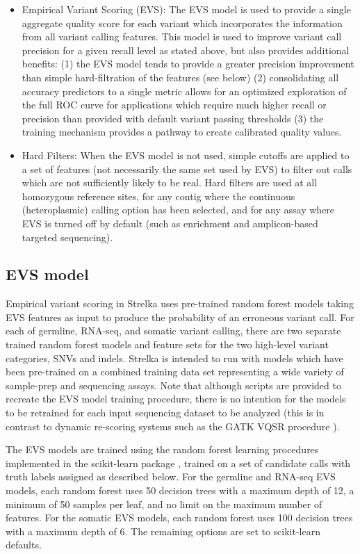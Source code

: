 \documentclass{article}
\begin{document}
\begin{itemize}
    \item Empirical Variant Scoring (EVS):
    The EVS model is used to provide a single aggregate quality score for each variant which incorporates the information from all variant calling features. This model is used to improve variant call precision for a given recall level as stated above, but also provides additional benefits: (1) the EVS model tends to provide a greater precision improvement than simple hard-filtration of the features (see below) (2) consolidating all accuracy predictors to a single metric allows for an optimized exploration of the full ROC curve for applications which require much higher recall or precision than provided with default variant passing thresholds (3) the training mechanism provides a pathway to create calibrated quality values.
    \item Hard Filters:
    When the EVS model is not used, simple cutoffs are applied to a set of features (not necessarily the same set used by EVS) to filter out calls which are not sufficiently likely to be real. Hard filters are used at all homozygous reference sites, for any contig where the continuous (heteroplasmic) calling option has been selected, and for any assay where EVS is turned off by default (such as enrichment and amplicon-based targeted sequencing).
\end{itemize}


\subsection{EVS model}

Empirical variant scoring in Strelka uses pre-trained random forest models taking EVS features as input to produce the probability of an erroneous variant call. For each of germline, RNA-seq, and somatic variant calling, there are two separate trained random forest models and feature sets for the two high-level variant categories, SNVs and indels. Strelka is intended to run with models which have been pre-trained on a combined training data set representing a wide variety of sample-prep and sequencing assays. Note that although scripts are provided to recreate the EVS model training procedure, there is no intention for the models to be retrained for each input sequencing dataset to be analyzed (this is in contrast to dynamic re-scoring systems such as the GATK VQSR procedure \cite{depristo2011}).

The EVS models are trained using the random forest learning procedures implemented in the scikit-learn package \cite{scikit-learn}, trained on a set of candidate calls with truth labels assigned as described below. For the germline and RNA-seq EVS models, each random forest uses 50 decision trees with a maximum depth of 12, a minimum of 50 samples per leaf, and no limit on the maximum number of features. For the somatic EVS models, each random forest uses 100 decision trees with a maximum depth of 6. The remaining options are set to scikit-learn defaults.
\end{document}

